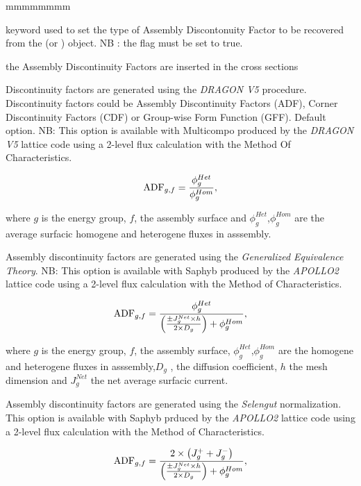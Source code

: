 \begin{ListeDeDescription}{mmmmmmmm}
\item[\moc{ADF}] keyword used to set the type of Assembly Discontonuity Factor to be recovered from the  (or )   object. NB : the  flag must be set to true. 

\item[\moc{MERGE}] the Assembly Discontinuity Factors are inserted in the cross sections

\item[\moc{DRA}] Discontinuity factors are generated using the \textit{DRAGON V5} procedure. Discontinuity factors could be Assembly Discontinuity Factors (ADF), Corner Discontinuity Factors (CDF) or Group-wise Form Function (GFF).  Default option.  NB: This option is available with Multicompo produced by the \textit{DRAGON V5} lattice code using a 2-level flux calculation with the Method Of Characteristics.

$$
{\rm ADF}_{g,f} = {\phi _{g}^{Het}\over \phi _{g}^{Hom}} ,
$$

where $g$ is the energy group, $f$, the assembly surface and $\phi _{g}^{Het}$,$\phi _{g}^{Hom}$ are the average surfacic homogene and heterogene fluxes in asssembly.


\item[\moc{GET}] Assembly discontinuity factors are generated using the \textit{Generalized Equivalence Theory}. NB: This option is available with Saphyb produced by the \textit{APOLLO2} lattice code using a 2-level flux calculation with the Method of Characteristics.

$$
{\rm ADF}_{g,f} = {\phi _{g}^{Het}\over \left({\pm J_{g}^{Net} \times h \over 2 \times  D _{g}}\right) + \phi_{g}^{Hom}} ,
$$

where $g$ is the energy group, $f$, the assembly surface, $\phi _{g}^{Het}$,$\phi _{g}^{Hom}$ are the homogene and heterogene fluxes in asssembly,$D _{g}$ , the diffusion coefficient, $h$ the  mesh dimension and $J_{g}^{Net}$ the net average surfacic current. 
 
\item[\moc{SEL}] Assembly discontinuity factors are generated using the \textit{Selengut} normalization. This option is available with Saphyb prduced by the \textit{APOLLO2} lattice code using a 2-level flux calculation with the Method of Characteristics.

$$
{\rm ADF}_{g,f} = {2 \times \left( J_{g}^{+} + J_{g}^{-} \right) \over \left({\pm J_{g}^{Net} \times h \over 2 \times D _{g}}\right) + \phi _{g}^{Hom}} ,
$$


\end{ListeDeDescription}
